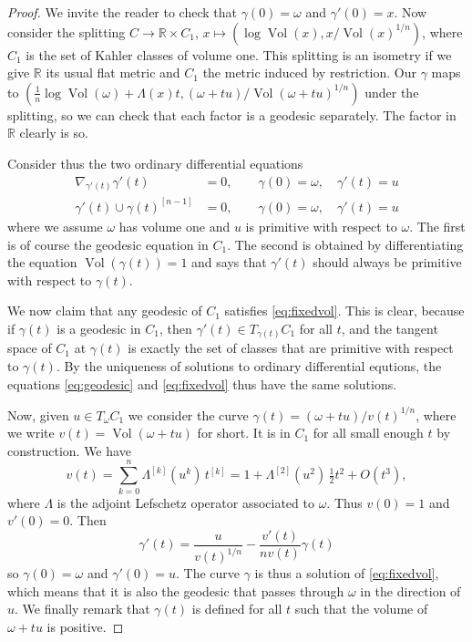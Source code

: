 \documentclass[11pt,a4paper]{amsart}
\theoremstyle{definition}
\theoremstyle{remark}
\newcommand{\RR}{\mathbb{R}}
\newcommand{\Vol}{\mathop{\mathrm{Vol}}}
\def\conn{\nabla}
\def\kf{\omega}
\def\Lef{\Lambda}
\def\^#1{^{[#1]}}
\begin{document}
\begin{proof}
We invite the reader to check that $\gamma(0) = \kf$ and $\gamma'(0) =
x$. Now consider the splitting $C \to \RR \times C_1$, $x \mapsto
(\log \Vol(x), x/\Vol(x)^{1/n})$, where $C_1$ is the set of Kahler classes of
volume one. This splitting is an isometry if we give $\RR$ its usual
flat metric and $C_1$ the metric induced by restriction. Our $\gamma$
maps to $(\frac{1}{n}\log \Vol(\kf) + \Lef(x) t, (\kf + t u)/\Vol(\kf + t u)^{1/n})$ under
the splitting, so we can check that each factor is a geodesic
separately. The factor in $\RR$ clearly is so.

Consider thus the two ordinary differential equations
\begin{align}
\label{eq:geodesic}
\conn_{\gamma'(t)} \gamma'(t) &= 0,
\qquad \gamma(0) = \kf,\quad \gamma'(t) = u
\\
\label{eq:fixedvol}
\gamma'(t) \cup \gamma(t)\^{n-1} &= 0,
\qquad \gamma(0) = \kf,\quad \gamma'(t) = u
\end{align}
where we assume $\kf$ has volume one and $u$ is primitive with respect
to $\kf$. The first is of course the geodesic equation in $C_1$. The
second is obtained by differentiating the equation $\Vol(\gamma(t)) = 1$
and says that $\gamma'(t)$ should always be primitive with respect to
$\gamma(t)$.

We now claim that any geodesic of $C_1$ satisfies \eqref{eq:fixedvol}.
This is clear, because if $\gamma(t)$ is a geodesic in $C_1$, then
$\gamma'(t) \in T_{\gamma(t)} C_1$ for all $t$, and the tangent space of
$C_1$ at $\gamma(t)$ is exactly the set of classes that are primitive
with respect to $\gamma(t)$. By the uniqueness of solutions to ordinary
differential equtions, the equations \eqref{eq:geodesic} and
\eqref{eq:fixedvol} thus have the same solutions.

Now, given $u \in T_{\kf} C_1$ we consider the curve $\gamma(t) = (\kf +
tu)/v(t)^{1/n}$, where we write $v(t) = \Vol(\kf + tu)$ for short. It
is in $C_1$ for all small enough $t$ by construction. We have
$$
v(t)
= \sum_{k=0}^n \Lef\^{k}(u^k) \, t\^k
= 1 + \Lef\^{2}(u^2) \, \tfrac12 t^2 + O(t^3),
$$
where $\Lef$ is the adjoint Lefschetz operator associated to $\kf$. Thus
$v(0)=1$ and $v'(0)=0$. Then
$$
\gamma'(t) = \frac{u}{v(t)^{1/n}} - \frac{v'(t)}{n v(t)} \gamma(t)
$$
so $\gamma(0) = \kf$ and $\gamma'(0) = u$. The curve $\gamma$ is thus a
solution of \eqref{eq:fixedvol}, which means that it is also the geodesic 
that passes through $\kf$ in the direction of $u$. We finally remark
that $\gamma(t)$ is defined for all $t$ such that the volume of $\kf +
tu$ is positive.
\end{proof}
\end{document}
